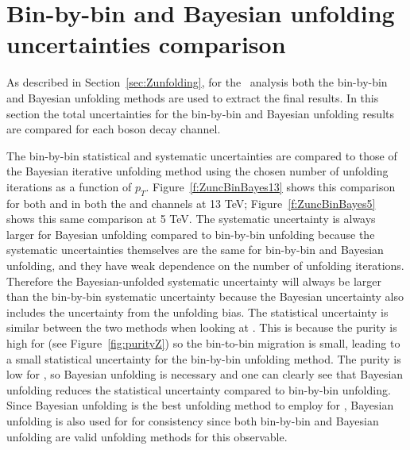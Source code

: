 \section{Bin-by-bin and Bayesian unfolding \ptz uncertainties comparison}
\label{sec:uncComparison}

As described in Section~\ref{sec:Zunfolding}, for the \ptz\ analysis both the bin-by-bin and Bayesian unfolding methods are used to extract the final results. In this section the total uncertainties for the bin-by-bin and Bayesian unfolding results are compared for each \Zboson boson decay channel.

The bin-by-bin statistical and systematic uncertainties are compared to those of the Bayesian iterative unfolding method using the chosen number of unfolding iterations as a function of $p_{T}$. Figure~\ref{f:ZuncBinBayes13} shows this comparison for both \ptdilep and \ut in both the \Zee and \Zmm channels at 13 TeV; Figure~\ref{f:ZuncBinBayes5} shows this same comparison at 5 TeV. The systematic uncertainty is always larger for Bayesian unfolding compared to bin-by-bin unfolding because the systematic uncertainties themselves are the same for bin-by-bin and Bayesian unfolding, and they have weak dependence on the number of unfolding iterations. Therefore the Bayesian-unfolded systematic uncertainty will always be larger than the bin-by-bin systematic uncertainty because the Bayesian uncertainty also includes the uncertainty from the unfolding bias. The statistical uncertainty is similar between the two methods when looking at \ptdilep. This is because the purity is high for \ptdilep (see Figure~\ref{fig:purityZ}) so the bin-to-bin migration is small, leading to a small statistical uncertainty for the bin-by-bin unfolding method. The purity is low for \ut, so Bayesian unfolding is necessary and one can clearly see that Bayesian unfolding reduces the statistical uncertainty compared to bin-by-bin unfolding. Since Bayesian unfolding is the best unfolding method to employ for \ut, Bayesian unfolding is also used for \ptdilep for consistency since both bin-by-bin and Bayesian unfolding are valid unfolding methods for this observable.


